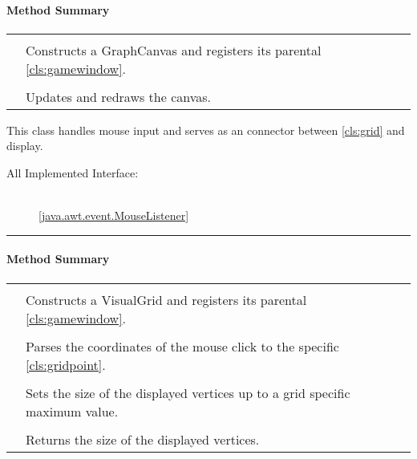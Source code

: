 \paragraph*{Method Summary}
\paragraph*{}
\begin{longtable}{Lp{10cm}}
	\startmethodtable
	 \\
	& Constructs a GraphCanvas and registers its parental \ref{cls:gamewindow}. \\
	 \\
	& Updates and redraws the canvas. \\ \hline
\end{longtable}



This class handles mouse input and serves as an connector between \ref{cls:grid} and display. \\ 
\begin{description}
	\item[All Implemented Interface:] \hfill \\
		\ref{java.awt.event.MouseListener}
\end{description}
\vspace{.5cm}
\hrule
\paragraph*{Method Summary}
\paragraph*{}
\begin{longtable}{Lp{10cm}}
	\startmethodtable
	 \\
	& Constructs a VisualGrid and registers its parental \ref{cls:gamewindow}. \\
	 \\
	& Parses the coordinates of the mouse click to the specific \ref{cls:gridpoint}. \\
	 \\
	& Sets the size of the displayed vertices up to a grid specific maximum value. \\
	 \\
	& Returns the size of the displayed vertices. \\ \hline
\end{longtable}


